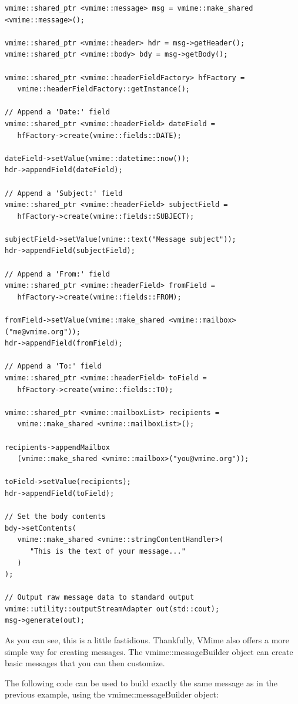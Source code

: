 \begin{lstlisting}[caption={Building a simple message from scratch}]
vmime::shared_ptr <vmime::message> msg = vmime::make_shared <vmime::message>();

vmime::shared_ptr <vmime::header> hdr = msg->getHeader();
vmime::shared_ptr <vmime::body> bdy = msg->getBody();

vmime::shared_ptr <vmime::headerFieldFactory> hfFactory =
   vmime::headerFieldFactory::getInstance();

// Append a 'Date:' field
vmime::shared_ptr <vmime::headerField> dateField =
   hfFactory->create(vmime::fields::DATE);

dateField->setValue(vmime::datetime::now());
hdr->appendField(dateField);

// Append a 'Subject:' field
vmime::shared_ptr <vmime::headerField> subjectField =
   hfFactory->create(vmime::fields::SUBJECT);

subjectField->setValue(vmime::text("Message subject"));
hdr->appendField(subjectField);

// Append a 'From:' field
vmime::shared_ptr <vmime::headerField> fromField =
   hfFactory->create(vmime::fields::FROM);

fromField->setValue(vmime::make_shared <vmime::mailbox>("me@vmime.org"));
hdr->appendField(fromField);

// Append a 'To:' field
vmime::shared_ptr <vmime::headerField> toField =
   hfFactory->create(vmime::fields::TO);

vmime::shared_ptr <vmime::mailboxList> recipients =
   vmime::make_shared <vmime::mailboxList>();

recipients->appendMailbox
   (vmime::make_shared <vmime::mailbox>("you@vmime.org"));

toField->setValue(recipients);
hdr->appendField(toField);

// Set the body contents
bdy->setContents(
   vmime::make_shared <vmime::stringContentHandler>(
      "This is the text of your message..."
   )
);

// Output raw message data to standard output
vmime::utility::outputStreamAdapter out(std::cout);
msg->generate(out);
\end{lstlisting}

As you can see, this is a little fastidious. Thankfully, VMime also offers a
more simple way for creating messages. The {\vcode vmime::messageBuilder}
object can create basic messages that you can then customize.

The following code can be used to build exactly the same message as in the
previous example, using the {\vcode vmime::messageBuilder} object:

